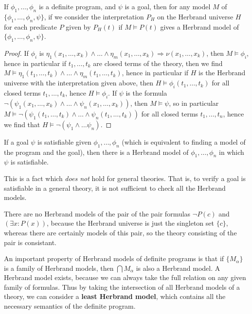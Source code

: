 \begin{theorem}
    If $\phi_1, \dots, \phi_n$ is a definite program, and $\psi$ is a goal, then for any model $M$ of $\{ \phi_1, \dots, \phi_n, \psi \}$, if we consider the interpretation $P_H$ on the Herbrand universe $H$ for each predicate $P$ given by $P_H(t)$ if $M \vDash P(t)$ gives a Herbrand model of $\{ \phi_1, \dots, \phi_n, \psi \}$.
\end{theorem}
\begin{proof}
    If $\phi_i$ is $\eta_1(x_1, \dots, x_k) \wedge \dots \wedge \eta_m(x_1, \dots, x_k) \Rightarrow \nu(x_1, \dots, x_k)$, then $M \vDash \phi_i$, hence in particular if $t_1, \dots, t_k$ are closed terms of the theory, then we find $M \vDash \eta_1(t_1, \dots, t_k) \wedge \dots \wedge \eta_m(t_1, \dots, t_k)$, hence in particular if $H$ is the Herbrand universe with the interpretation given above, then $H \vDash \phi_i(t_1, \dots, t_k)$ for all closed terms $t_1, \dots, t_k$, hence $H \vDash \phi_i$. If $\psi$ is the formula $\neg (\psi_1(x_1, \dots, x_k) \wedge \dots \wedge \psi_n(x_1, \dots, x_k))$, then $M \vDash \psi$, so in particular $M \vDash \neg (\psi_1(t_1, \dots, t_k) \wedge \dots \wedge \psi_n(t_1, \dots, t_k))$ for all closed terms $t_1, \dots, t_n$, hence we find that $H \vDash \neg(\psi_1 \wedge \dots \psi_n)$.
\end{proof}

\begin{corollary}
    If a goal $\psi$ is satisfiable given $\phi_1, \dots, \phi_n$ (which is equivalent to finding a model of the program and the goal), then there is a Herbrand model of $\phi_1, \dots, \phi_n$ in which $\psi$ is satisfiable.
\end{corollary}

This is a fact which {\it does not} hold for general theories. That is, to verify a goal is satisfiable in a general theory, it is not sufficient to check all the Herbrand models.

\begin{example}
    There are no Herbrand models of the pair of the pair formulas $\neg P(c)$ and $(\exists x: P(x))$, because the Herbrand universe is just the singleton set $\{ c \}$, whereas there are certainly models of this pair, so the theory consisting of the pair is consistant.
\end{example}

An important property of Herbrand models of definite programs is that if $\{ M_\alpha \}$ is a family of Herbrand models, then $\bigcap M_\alpha$ is also a Herbrand model. A Herbrand model exists, because we can always take the full relation on any given family of formulas. Thus by taking the intersection of all Herbrand models of a theory, we can consider a {\bf least Herbrand model}, which contains all the necessary semantics of the definite program.

